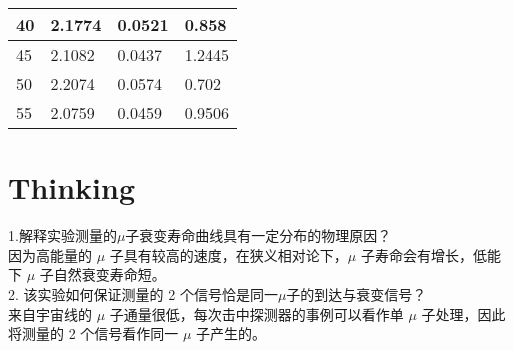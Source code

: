 \documentclass[12pt, a4paper, oneside]{ctexart}
\begin{document}
\begin{spacing}{2.0}
\begin{center}
\begin{table}[H]
\begin{tabular}{|l|l|l|l|}
        \hline
        40 & 2.1774                                        & 0.0521                                                             & 0.858                         \\ 
        \hline
        45 & 2.1082                                        & 0.0437                                                             & 1.2445                        \\ 
        \hline
        50 & 2.2074                                        & 0.0574                                                             & 0.702                         \\ 
        \hline
        55 & 2.0759                                        & 0.0459                                                             & 0.9506                        \\
        \hline
        \end{tabular}
        \end{table}
\end{center}




\section{Thinking}

1.解释实验测量的$\mu$子衰变寿命曲线具有一定分布的物理原因？\\ 
因为高能量的 $\mu$ 子具有较高的速度，在狭义相对论下，$\mu$ 子寿命会有增长，低能下 $\mu$ 子自然衰变寿命短。\\
2. 该实验如何保证测量的 2 个信号恰是同一$\mu$子的到达与衰变信号？\\
来自宇宙线的 $\mu$ 子通量很低，每次击中探测器的事例可以看作单 $\mu$ 子处理，因此将测量的 2 个信号看作同一 $\mu$ 子产生的。


\end{spacing}{}



\end{document}
